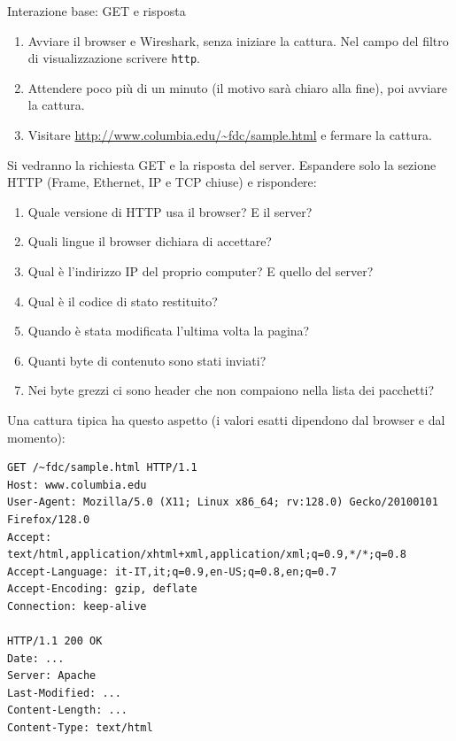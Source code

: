\begin{esercizio}{Interazione base: GET e risposta}
\begin{enumerate}
    \item Avviare il browser e Wireshark, senza iniziare la cattura. Nel campo del filtro di visualizzazione scrivere \texttt{http}.
    \item Attendere poco più di un minuto (il motivo sarà chiaro alla fine), poi avviare la cattura.
    \item Visitare \url{http://www.columbia.edu/~fdc/sample.html} e fermare la cattura.
\end{enumerate}
Si vedranno la richiesta GET e la risposta del server. Espandere solo la sezione HTTP (Frame, Ethernet, IP e TCP chiuse) e
rispondere:
\begin{enumerate}[label=(\alph*)]
    \item Quale versione di HTTP usa il browser? E il server?
    \item Quali lingue il browser dichiara di accettare?
    \item Qual è l'indirizzo IP del proprio computer? E quello del server?
    \item Qual è il codice di stato restituito?
    \item Quando è stata modificata l'ultima volta la pagina?
    \item Quanti byte di contenuto sono stati inviati?
    \item Nei byte grezzi ci sono header che non compaiono nella lista dei pacchetti?
\end{enumerate}
\end{esercizio}

\svolgimento
Una cattura tipica ha questo aspetto (i valori esatti dipendono dal browser e dal momento):

\begin{lstlisting}[language=http]
GET /~fdc/sample.html HTTP/1.1
Host: www.columbia.edu
User-Agent: Mozilla/5.0 (X11; Linux x86_64; rv:128.0) Gecko/20100101 Firefox/128.0
Accept: text/html,application/xhtml+xml,application/xml;q=0.9,*/*;q=0.8
Accept-Language: it-IT,it;q=0.9,en-US;q=0.8,en;q=0.7
Accept-Encoding: gzip, deflate
Connection: keep-alive

HTTP/1.1 200 OK
Date: ...
Server: Apache
Last-Modified: ...
Content-Length: ...
Content-Type: text/html
\end{lstlisting}

